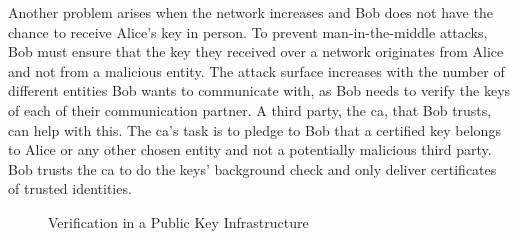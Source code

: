 Another problem arises when the network increases and Bob does not have the
chance to receive Alice's key in person. To prevent man-in-the-middle attacks,
Bob must ensure that the key they received over a network originates from Alice
and not from a malicious entity. The attack surface increases with the number of
different entities Bob wants to communicate with, as Bob needs to verify the
keys of each of their communication partner. A third party, the \gls{ca}, that
Bob trusts, can help with this. The \gls{ca}'s task is to pledge to Bob that a
certified key belongs to Alice or any other chosen entity and not a potentially
malicious third party. Bob trusts the \gls{ca} to do the keys' background check
and only deliver certificates of trusted identities.
\\

\begin{figure}
  \begin{center}
    
    \caption{Verification in a Public Key Infrastructure}
    \label{fig:state:technical:chain_of_trust}
  \end{center}
\end{figure}

